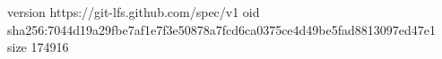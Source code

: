 version https://git-lfs.github.com/spec/v1
oid sha256:7044d19a29fbe7af1e7f3e50878a7fcd6ca0375ce4d49be5fad8813097ed47e1
size 174916
